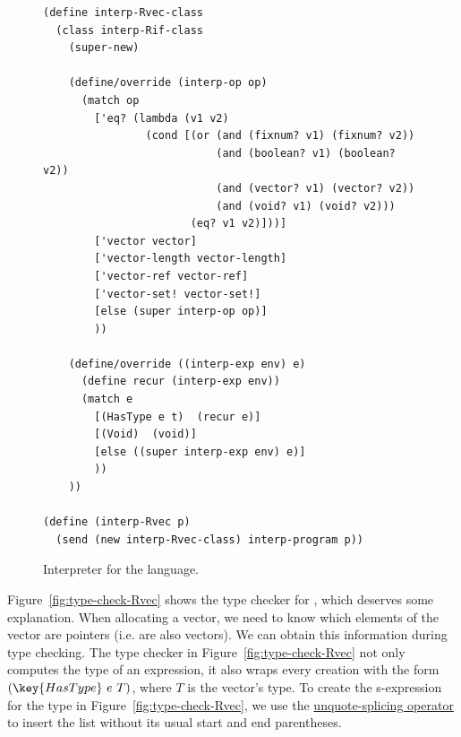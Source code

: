 \documentclass[11pt]{book}
\begin{document}
\begin{figure}[tbp]
\begin{lstlisting}
(define interp-Rvec-class
  (class interp-Rif-class
    (super-new)

    (define/override (interp-op op)
      (match op
        ['eq? (lambda (v1 v2)
                (cond [(or (and (fixnum? v1) (fixnum? v2))
                           (and (boolean? v1) (boolean? v2))
                           (and (vector? v1) (vector? v2))
                           (and (void? v1) (void? v2)))
                       (eq? v1 v2)]))]
        ['vector vector]
        ['vector-length vector-length]
        ['vector-ref vector-ref]
        ['vector-set! vector-set!]
        [else (super interp-op op)]
        ))

    (define/override ((interp-exp env) e)
      (define recur (interp-exp env))
      (match e
        [(HasType e t)  (recur e)]
        [(Void)  (void)]
        [else ((super interp-exp env) e)]
        ))
    ))

(define (interp-Rvec p)
  (send (new interp-Rvec-class) interp-program p))
\end{lstlisting}
\caption{Interpreter for the \LangVec{} language.}
\label{fig:interp-Rvec}
\end{figure}

Figure~\ref{fig:type-check-Rvec} shows the type checker for \LangVec{}, which
deserves some explanation. When allocating a vector, we need to know
which elements of the vector are pointers (i.e. are also vectors). We
can obtain this information during type checking. The type checker in
Figure~\ref{fig:type-check-Rvec} not only computes the type of an
expression, it also wraps every  creation with the form
$(\key{HasType}~e~T)$, where $T$ is the vector's type.
%
To create the s-expression for the  type in
Figure~\ref{fig:type-check-Rvec}, we use the
\href{https://docs.racket-lang.org/reference/quasiquote.html}{unquote-splicing
  operator}  to insert the list  without its usual
start and end parentheses.  
\end{document}
